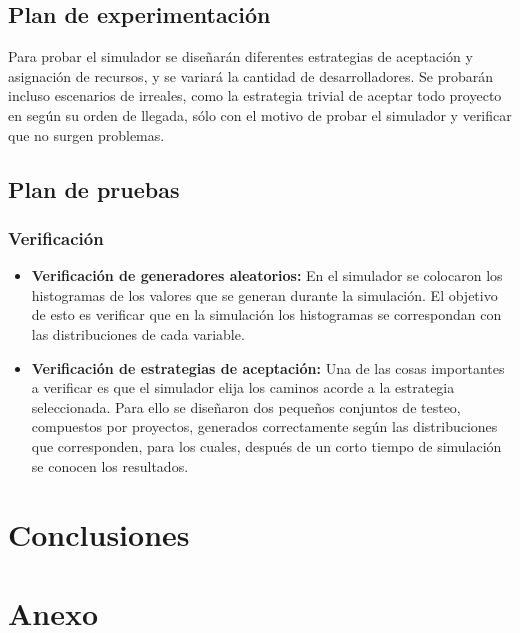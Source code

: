 \documentclass[a4paper,10pt]{article}
\begin{document}
\subsection{Plan de experimentación}
Para probar el simulador se diseñarán diferentes estrategias de aceptación y asignación de recursos, y se variará la cantidad de desarrolladores. 
Se probarán incluso escenarios de irreales, como la estrategia trivial de aceptar todo proyecto en según su orden de llegada, sólo con el motivo de probar el simulador 
y verificar que no surgen problemas.\\


\subsection{Plan de pruebas}

\subsubsection{Verificación}


\begin{itemize}
    \item \textbf{Verificación de generadores aleatorios:} En el simulador se colocaron los histogramas de los valores que se generan durante la simulación. El objetivo 
        de esto es verificar que en la simulación los histogramas se correspondan con las distribuciones de cada variable.
    \item \textbf{Verificación de estrategias de aceptación:} Una de las cosas importantes a verificar es que el simulador elija los caminos acorde a la estrategia seleccionada. 
        Para ello se diseñaron dos pequeños conjuntos de testeo, compuestos por proyectos, generados correctamente según las distribuciones que corresponden, para los cuales, 
        después de un corto tiempo de simulación se conocen los resultados.

\end{itemize}


\section{Conclusiones}


\clearpage
\appendix
\section{Anexo}
\end{document}

